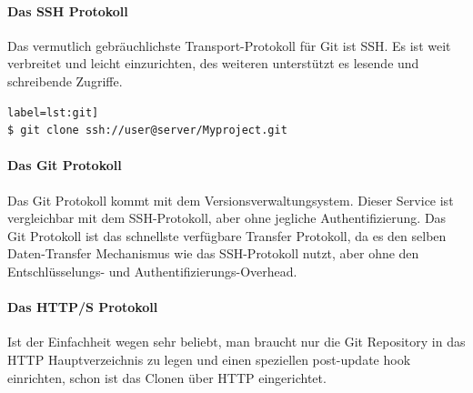 \documentclass[12pt,a4paper,bibliography=totocnumbered,listof=totocnumbered]{scrartcl}
\begin{document}
\paragraph{Das SSH Protokoll}
Das vermutlich gebräuchlichste Transport-Protokoll für Git ist SSH.
Es ist weit verbreitet und leicht einzurichten, des weiteren unterstützt es lesende und schreibende Zugriffe.

\begin{lstlisting}[caption=SSH] label=lst:git]
$ git clone ssh://user@server/Myproject.git
\end{lstlisting}

\paragraph{Das Git Protokoll}
Das Git Protokoll kommt mit dem Versionsverwaltungsystem.
Dieser Service ist vergleichbar mit dem SSH-Protokoll, aber ohne jegliche Authentifizierung. Das Git Protokoll ist das schnellste verfügbare Transfer Protokoll, da es den selben Daten-Transfer Mechanismus wie das SSH-Protokoll nutzt, aber ohne den Entschlüsselungs- und Authentifizierungs-Overhead.

\paragraph{Das HTTP/S Protokoll}
Ist der Einfachheit wegen sehr beliebt, man braucht nur die Git Repository in das HTTP Hauptverzeichnis zu legen und einen speziellen post-update hook einrichten, schon ist das Clonen über HTTP eingerichtet.  


\renewcommand\refname{Quellenverzeichnis}


\pagebreak

\setcounter{page}{1}
\end{document}
